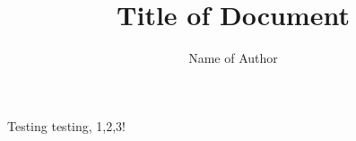 \documentclass{article}
\title{Title of Document}
\author{Name of Author}
\begin{document}
\maketitle

Testing testing, 1,2,3!
\end{document}

